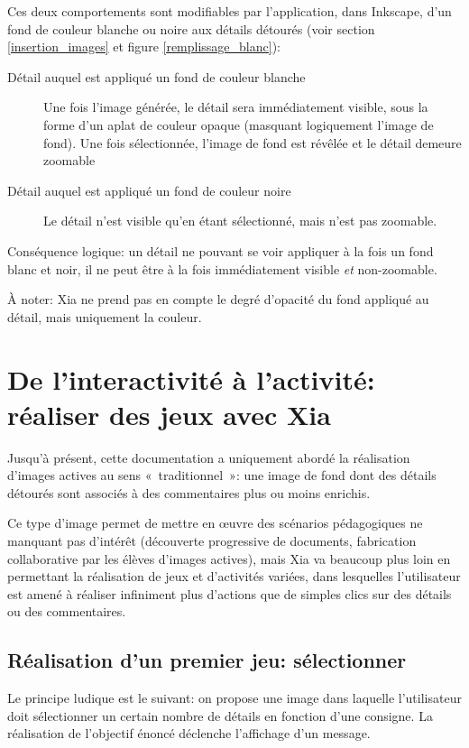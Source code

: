 \documentclass[a4paper,12pt]{report}
\begin{document}
Ces deux comportements sont modifiables par l'application, dans Inkscape, d'un fond de couleur blanche ou noire
aux détails détourés (voir section \ref{insertion_images} et figure \ref{remplissage_blanc}):
\begin{description}
 \item [Détail auquel est appliqué un fond de couleur blanche] Une fois l'image générée, 
 le détail sera immédiatement visible, sous la forme d'un aplat de couleur opaque (masquant
 logiquement l'image de fond). Une fois sélectionnée, l'image de fond est révêlée et le détail demeure zoomable
 \item [Détail auquel est appliqué un fond de couleur noire] Le détail n'est visible qu'en étant sélectionné, mais
 n'est pas zoomable.
\end{description}

Conséquence logique: un détail ne pouvant se voir appliquer à la fois un fond blanc et noir, il ne peut être à la
fois immédiatement visible \textit{et} non-zoomable.

À noter: Xia ne prend pas en compte le degré d'opacité du fond appliqué au détail, mais uniquement la couleur.


\section{De l'interactivité à l'activité: réaliser des jeux avec Xia}

Jusqu'à présent, cette documentation a uniquement abordé la réalisation d'images actives au sens «~traditionnel~»:
une image de fond dont des détails détourés sont associés à des commentaires plus ou moins enrichis.

Ce type d'image permet de mettre en œuvre des scénarios pédagogiques ne manquant pas d'intérêt 
(découverte progressive de documents, fabrication collaborative par les élèves d'images actives), 
mais Xia va beaucoup plus loin en permettant la réalisation de jeux et d'activités variées, dans lesquelles
l'utilisateur est amené à réaliser infiniment plus d'actions que de simples clics sur des détails ou des commentaires.

\subsection{Réalisation d'un premier jeu: sélectionner}

Le principe ludique est le suivant: on propose une image dans laquelle l'utilisateur 
doit sélectionner un certain nombre de détails en fonction d'une consigne. 
La réalisation de l'objectif énoncé déclenche l'affichage d'un message.
\end{document}
